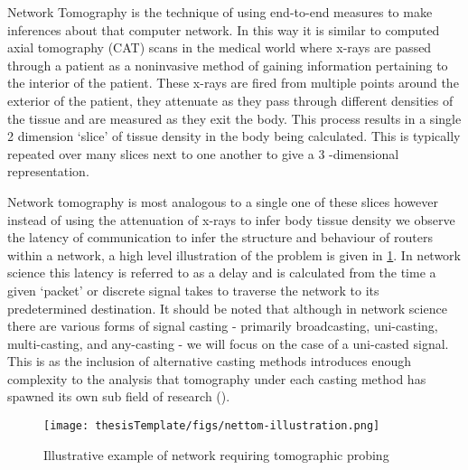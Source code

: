 Network Tomography is the technique of using end-to-end measures to make inferences about that computer network. In this way it is similar to computed axial tomography (CAT) scans in the medical world where x-rays are passed through a patient as a noninvasive method of gaining information pertaining to the interior of the patient. These x-rays are fired from multiple points around the exterior of the patient, they attenuate as they pass through different densities of the tissue and are measured as they exit the body. This process results in a single 2 dimension ‘slice’ of tissue density in the body being calculated. This is typically repeated over many slices next to one another to give a 3 -dimensional representation.\par
Network tomography is most analogous to a single one of these slices however instead of using the attenuation of x-rays to infer body tissue density we observe the latency of communication to infer the structure and behaviour of routers within a network, a high level illustration of the problem is given in \ref{fig:nettom?}. In network science this latency is referred to as a delay and is calculated from the time a given ‘packet’ or discrete signal takes to traverse the network to its predetermined destination. It should be noted that although in network science there are various forms of signal casting - primarily broadcasting, uni-casting, multi-casting, and any-casting - we will focus on the case of a uni-casted signal. This is as the inclusion of alternative casting methods introduces enough complexity to the analysis that tomography under each casting method has spawned its own sub field of research (\cite{lawrence_network_2006}).\par
\begin{figure}
    \centering
    \texttt{[image: thesisTemplate/figs/nettom-illustration.png]}
    \caption[Illustrative example of network requiring tomographic probing]{Illustrative example of network requiring tomographic probing \cite{lawrence_network_2006}}
    \label{fig:nettom?}
\end{figure}

